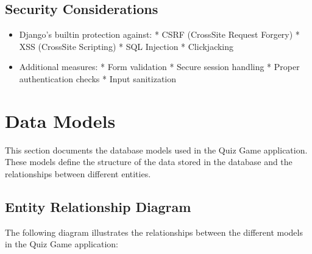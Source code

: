 \documentclass[letterpaper,10pt,english]{sphinxmanual}
\begin{document}
\subsection{Security Considerations}
\label{\detokenize{architecture:security-considerations}}\begin{itemize}
\item {} 
\sphinxAtStartPar
Django’s built\sphinxhyphen{}in protection against:
* CSRF (Cross\sphinxhyphen{}Site Request Forgery)
* XSS (Cross\sphinxhyphen{}Site Scripting)
* SQL Injection
* Clickjacking

\item {} 
\sphinxAtStartPar
Additional measures:
* Form validation
* Secure session handling
* Proper authentication checks
* Input sanitization

\end{itemize}

\sphinxstepscope


\section{Data Models}
\label{\detokenize{models:data-models}}\label{\detokenize{models::doc}}
\sphinxAtStartPar
This section documents the database models used in the Quiz Game application.
These models define the structure of the data stored in the database and the
relationships between different entities.


\subsection{Entity Relationship Diagram}
\label{\detokenize{models:entity-relationship-diagram}}
\sphinxAtStartPar
The following diagram illustrates the relationships between the different models in the Quiz Game application:

\end{document}
